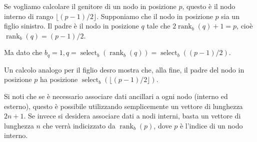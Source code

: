 \documentclass[\main/main.tex]{subfiles}
\begin{document}
\begin{definition}
    Se vogliamo calcolare il genitore di un nodo in posizione \(p\), questo è il nodo interno di rango \(\lfloor(p-1) / 2\rfloor\). Supponiamo che il nodo in posizione \(p\) sia un figlio sinistro. Il padre è il nodo in posizione \(q\) tale che \(2 \operatorname{rank}_{b}(q)+1=p\), cioè \(\operatorname{rank}_{b}(q)=(p-1) / 2\).
    
    Ma dato che \(b_{q}=1, q=\operatorname{select}_{b}\left(\operatorname{rank}_{b}(q)\right)=\operatorname{select}_{b}((p-1) / 2)\).
    
    Un calcolo analogo per il figlio desro mostra che, alla fine, il padre del nodo in posizione \(p\) ha posizione \(\operatorname{select}_{b}(\lfloor(p-1) / 2\rfloor)\).
    
    Si noti che se è necessario associare dati ancillari a ogni nodo (interno ed esterno), questo è possibile utilizzando semplicemente un vettore di lunghezza \(2n+1\). Se invece si desidera associare dati a nodi interni, basta un vettore di lunghezza \(n\) che verrà indicizzato da \(\operatorname{rank}_{b}(p)\), dove \(p\) è l'indice di un nodo interno.
\end{definition}
\clearpage
\end{document}
